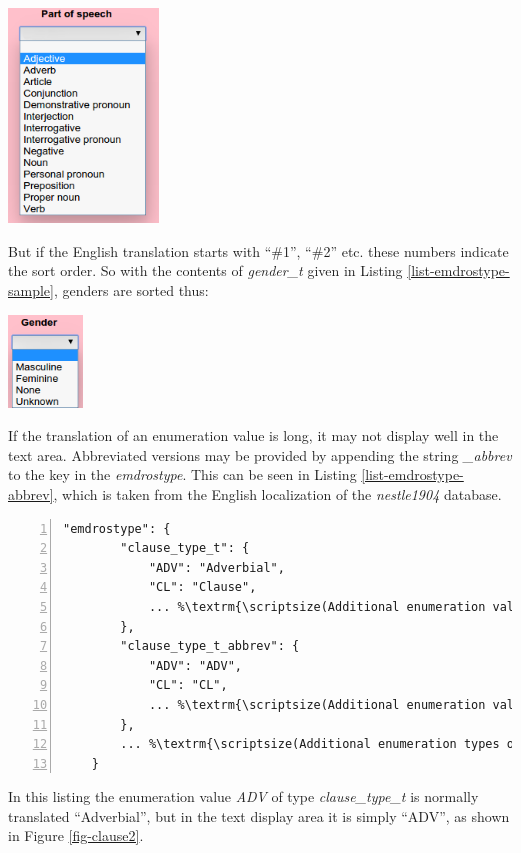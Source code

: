\documentclass[11pt,oneside,a4paper]{memoir}
\begin{document}
\begin{center}
  \includegraphics[width=0.3\textwidth]{psp.png}
\end{center}

But if the English translation starts with ``\#1'', ``\#2'' etc. these numbers indicate the sort
order. So with the contents of \emph{gender\_t} given in Listing \ref{list-emdrostype-sample},
genders are sorted thus:

\begin{center}
  \includegraphics[width=0.148\textwidth]{gender.png}
\end{center}


If the translation of an enumeration value is long, it may not display well in the text area.
Abbreviated versions may be provided by appending the string \emph{\_abbrev} to the key in the
\emph{emdrostype}. This can be seen in Listing \ref{list-emdrostype-abbrev}, which is taken from
the English localization of the \emph{nestle1904} database.

\begin{lstlisting}[numbers=left,caption=Abbreviated emdrostype values,label=list-emdrostype-abbrev]
    "emdrostype": {
        "clause_type_t": {
            "ADV": "Adverbial",
            "CL": "Clause",
            ... %\textrm{\scriptsize(Additional enumeration values omitted)}%
        },
        "clause_type_t_abbrev": {
            "ADV": "ADV",
            "CL": "CL",
            ... %\textrm{\scriptsize(Additional enumeration values omitted)}%
        },
        ... %\textrm{\scriptsize(Additional enumeration types omitted)}%
    }
\end{lstlisting}

In this listing the enumeration value \emph{ADV} of type \emph{clause\_type\_t} is normally translated ``Adverbial'', but in
the text display area it is simply ``ADV'', as shown in Figure \ref{fig-clause2}.
\end{document}
